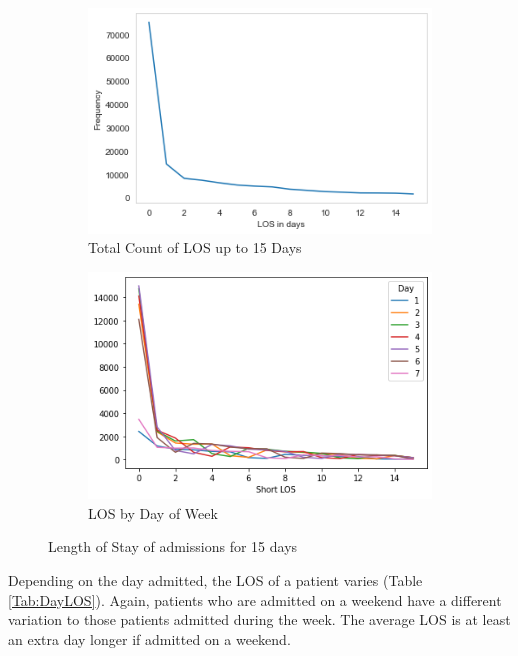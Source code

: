 \documentclass[../thesis.tex]{subfiles}
\begin{document}
\begin{figure}
\centering
\begin{subfigure}{.5\textwidth}
  \centering
  \includegraphics[width=\textwidth]{Chapter3/Figures/LOS.png}
  \caption{Total Count of LOS up to 15 Days}
  \label{Fig:LOS1}
\end{subfigure}%
\begin{subfigure}{.5\textwidth}
  \centering
  \includegraphics[width=\textwidth]{Chapter3/Figures/Short LOS.png}
  \caption{LOS by Day of Week}
  \label{Fig:LOS2}
\end{subfigure}
\caption{Length of Stay of admissions for 15 days}
\label{Fig:LOS}
\end{figure}

Depending on the day admitted, the LOS of a patient varies (Table \ref{Tab:DayLOS}). Again, patients who are admitted on a weekend have a different variation to those patients admitted during the week. The average LOS is at least an extra day longer if admitted on a weekend.
\end{document}
